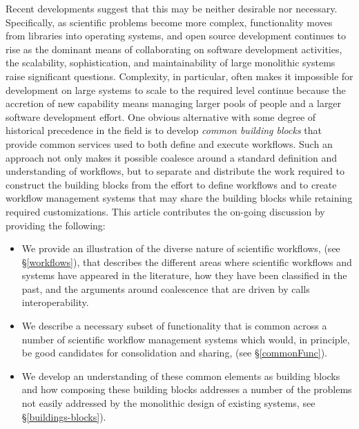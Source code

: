 Recent developments suggest that this may be neither desirable nor necessary. Specifically, as scientific problems become more complex, functionality moves from libraries into operating systems, and open source development continues to rise as the dominant means of collaborating on software development activities, the scalability, sophistication, and maintainability of large monolithic systems raise significant questions. Complexity, in particular, often makes it impossible for development on large systems to scale to the required level continue because the accretion of new capability means managing larger pools of people and a larger software development effort. One obvious alternative with some degree of historical precedence in the field is to develop \textit{common building blocks} that provide common services used to both define and execute workflows. Such an approach not only makes it possible coalesce around a standard definition and understanding of workflows, but to separate and distribute the work required to construct the building blocks from the effort to define workflows and to create workflow management systems that may share the building blocks while retaining required customizations. This article contributes the on-going discussion by providing the following:
\begin{itemize}
    \item We provide an illustration of the diverse nature of scientific workflows, (see \S \ref{workflows}), that describes the different areas where scientific workflows and systems have appeared in the literature, how they have been classified in the past, and the arguments around coalescence that are driven by calls interoperability.
    \item We describe a necessary subset of functionality that is common across a number of scientific workflow management systems which would, in principle, be good candidates for consolidation and sharing, (see \S \ref{commonFunc}).
    \item We develop an understanding of these common elements as building blocks and how composing these building blocks addresses a number of the problems not easily addressed by the monolithic design of existing systems, see \S \ref{buildings-blocks}).
\end{itemize}

